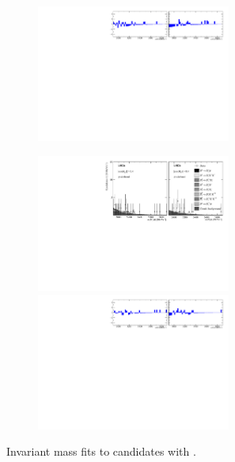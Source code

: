 \begin{figure}[!h]
\begin{subfigure}[t]{1.0\textwidth}
        \includegraphics[width=0.7\textwidth]{figs/Appendix_FitCategories/residuals_DsPhi_Ds2KPiPi_both_summed_splitHel_splitKKPi_s21_s21r1_s24_s26.pdf}
    \end{subfigure}
    \begin{subfigure}[t]{1.0\textwidth}
        \centering
        \includegraphics[width=0.7\textwidth]{figs/Appendix_FitCategories/canvas_DsPhiSide_Ds2KPiPi_both_summed_splitHel_splitKKPi_s21_s21r1_s24_s26.pdf}\\
        \includegraphics[width=0.7\textwidth]{figs/Appendix_FitCategories/residuals_DsPhiSide_Ds2KPiPi_both_summed_splitHel_splitKKPi_s21_s21r1_s24_s26.pdf}
    \end{subfigure}
    \caption{Invariant mass fits to \decay{\Bp}{\Dsp\phiz} candidates with \decay{\Dsp}{\Kp\pim\pip}.}
\end{figure}

